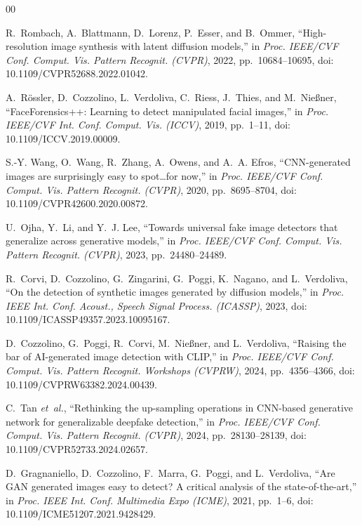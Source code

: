 \documentclass[conference]{IEEEtran}
\begin{document}
\begin{thebibliography}{00}

 R.~Rombach, A.~Blattmann, D.~Lorenz, P.~Esser, and
B.~Ommer, ``High-resolution image synthesis with latent diffusion models,'' in
\emph{Proc. IEEE/CVF Conf. Comput. Vis. Pattern Recognit. (CVPR)},
2022, pp.~10684--10695, doi: 10.1109/CVPR52688.2022.01042.

 A.~R\"ossler, D.~Cozzolino, L.~Verdoliva, C.~Riess,
J.~Thies, and M.~Nie{\ss}ner, ``FaceForensics++: Learning to detect
manipulated facial images,'' in \emph{Proc. IEEE/CVF Int. Conf. Comput. Vis. (ICCV)}, 2019, pp.~1--11, doi: 10.1109/ICCV.2019.00009.

 S.-Y. Wang, O.~Wang, R.~Zhang, A.~Owens, and A.~A. Efros,
``CNN-generated images are surprisingly easy to spot\ldots for now,'' in
\emph{Proc. IEEE/CVF Conf. Comput. Vis. Pattern Recognit. (CVPR)},
2020, pp.~8695--8704, doi: 10.1109/CVPR42600.2020.00872.

 U.~Ojha, Y.~Li, and Y.~J. Lee, ``Towards universal fake
image detectors that generalize across generative models,'' in \emph{Proc.
IEEE/CVF Conf. Comput. Vis. Pattern Recognit. (CVPR)}, 2023,
pp.~24480--24489.

 R.~Corvi, D.~Cozzolino, G.~Zingarini, G.~Poggi,
K.~Nagano, and L.~Verdoliva, ``On the detection of synthetic images generated
by diffusion models,'' in \emph{Proc. IEEE Int. Conf. Acoust., Speech Signal Process. (ICASSP)}, 2023, doi: 10.1109/ICASSP49357.2023.10095167.

 D.~Cozzolino, G.~Poggi, R.~Corvi, M.~Nie{\ss}ner, and
L.~Verdoliva, ``Raising the bar of AI-generated image detection with CLIP,'' in
\emph{Proc. IEEE/CVF Conf. Comput. Vis. Pattern Recognit. Workshops
(CVPRW)}, 2024, pp.~4356--4366, doi: 10.1109/CVPRW63382.2024.00439.

 C.~Tan \emph{et~al.}, ``Rethinking the up-sampling operations
in CNN-based generative network for generalizable deepfake detection,'' in
\emph{Proc. IEEE/CVF Conf. Comput. Vis. Pattern Recognit. (CVPR)},
2024, pp.~28130--28139, doi: 10.1109/CVPR52733.2024.02657.

 D.~Gragnaniello, D.~Cozzolino, F.~Marra, G.~Poggi,
and L.~Verdoliva, ``Are GAN generated images easy to detect? A critical
analysis of the state-of-the-art,'' in \emph{Proc. IEEE Int. Conf. Multimedia Expo (ICME)}, 2021, pp.~1--6, doi: 10.1109/ICME51207.2021.9428429.


\end{thebibliography}
\end{document}

